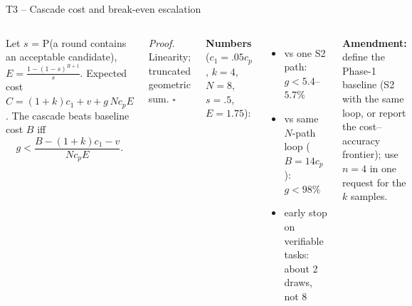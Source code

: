 \documentclass[aspectratio=169,10pt]{beamer}
\begin{document}
\begin{frame}{T3 -- Cascade cost and break-even escalation}
\begin{columns}[T]
\begin{theorem}[T3]\small
Let $s$ = P(a round contains an acceptable candidate), $E=\frac{1-(1-s)^{R+1}}{s}$. Expected cost
$C=(1{+}k)c_1+v+g\,N c_p E$. The cascade beats baseline cost $B$ iff
$$g<\frac{B-(1{+}k)c_1-v}{N c_p E}.$$
\end{theorem}
\small\textit{Proof.} Linearity; truncated geometric sum. $\square$

\textbf{Numbers} ($c_1{=}.05c_p$, $k{=}4$, $N{=}8$, $s{=}.5$, $E{=}1.75$):
\begin{itemize}\setlength\itemsep{0pt}
\item vs one S2 path: $g<5.4$--$5.7\%$
\item vs same $N$-path loop ($B{=}14c_p$): $g<98\%$
\item early stop on verifiable tasks: about 2 draws, not 8
\end{itemize}

\scriptsize\textbf{Amendment:} define the Phase-1 baseline (S2 with the same loop, or report the cost--accuracy frontier); use $n{=}4$ in one request for the $k$ samples.
\end{columns}
\end{frame}
\end{document}
